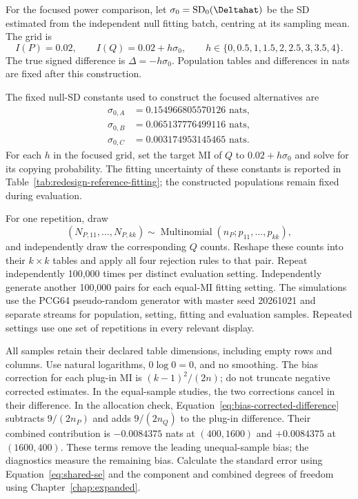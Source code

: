 For the focused power comparison, let
\(\sigma_0=\operatorname{SD}_0(\Deltahat)\) be the SD estimated from the
independent null fitting batch, centring at its sampling mean. The grid is
\begin{equation}
 I(P)=0.02,\qquad I(Q)=0.02+h\sigma_0,\qquad
 h\in\{0,0.5,1,1.5,2,2.5,3,3.5,4\}.
 \label{eq:redesign-power-grid}
\end{equation}
The true signed difference is \(\Delta=-h\sigma_0\). Population tables
and differences in nats are fixed after this construction.

The fixed null-SD constants used to construct the focused alternatives are
\begin{align*}
 \sigma_{0,A}&=0.154966805570126\text{ nats},\\
 \sigma_{0,B}&=0.065137776499116\text{ nats},\\
 \sigma_{0,C}&=0.003174953145465\text{ nats}.
\end{align*}
For each \(h\) in the focused grid, set the target MI of \(Q\) to
\(0.02+h\sigma_0\) and solve for its copying probability. The fitting
uncertainty of these constants is reported in
Table~\ref{tab:redesign-reference-fitting}; the constructed populations
remain fixed during evaluation.

For one repetition, draw
\begin{equation}
 (N_{P,11},\ldots,N_{P,kk})\sim\operatorname{Multinomial}
      (n_P;p_{11},\ldots,p_{kk}),
\end{equation}
and independently draw the corresponding \(Q\) counts.
Reshape these counts into their \(k\times k\) tables and apply all four
rejection rules to that pair. Repeat independently 100,000 times per distinct
evaluation setting. Independently generate another 100,000 pairs for each
equal-MI fitting setting. The simulations use the PCG64 pseudo-random
generator with master seed 20261021 and separate streams for population,
setting, fitting and evaluation samples.
Repeated settings use one set of repetitions in every relevant display.

All samples retain their declared table dimensions, including empty rows
and columns. Use natural logarithms, \(0\log0=0\), and no smoothing.
The bias correction for each plug-in MI is \((k-1)^2/(2n)\); do not truncate
negative corrected estimates. In the equal-sample studies, the two
corrections cancel in their difference. In the allocation check,
Equation~\eqref{eq:bias-corrected-difference} subtracts
\(9/(2n_P)\) and adds \(9/(2n_Q)\) to the plug-in difference.
Their combined contribution is \(-0.0084375\) nats at \((400,1600)\)
and \(+0.0084375\) at \((1600,400)\). These terms remove the leading
unequal-sample bias; the diagnostics measure the remaining bias.
Calculate the standard error using
Equation~\eqref{eq:shared-se} and the component and combined degrees of freedom
using Chapter~\ref{chap:expanded}.

